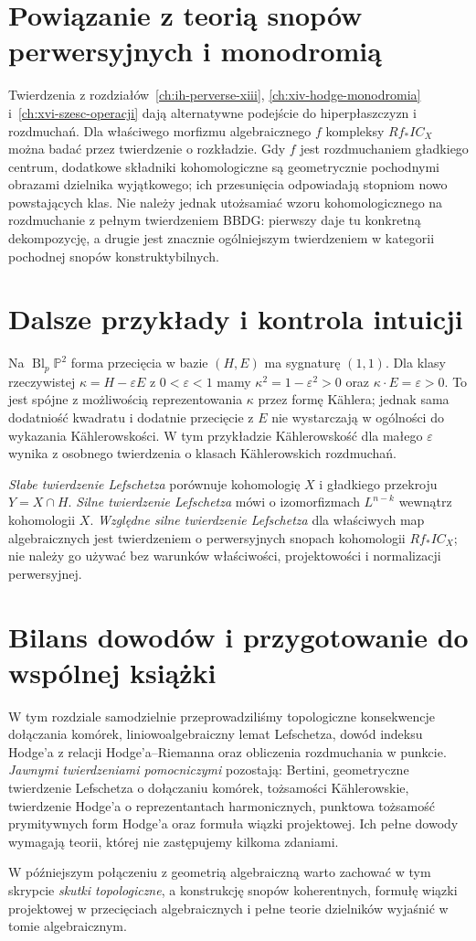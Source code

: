 \section{Powiązanie z teorią snopów perwersyjnych i monodromią}
Twierdzenia z rozdziałów~\ref{ch:ih-perverse-xiii},
\ref{ch:xiv-hodge-monodromia} i~\ref{ch:xvi-szesc-operacji}
dają alternatywne podejście do hiperpłaszczyzn i rozdmuchań.
Dla właściwego morfizmu algebraicznego $f$ kompleksy $Rf_*IC_X$
można badać przez twierdzenie o rozkładzie.
Gdy $f$ jest rozdmuchaniem gładkiego centrum,
dodatkowe składniki kohomologiczne są geometrycznie
pochodnymi obrazami dzielnika wyjątkowego; ich przesunięcia
odpowiadają stopniom nowo powstających klas.
Nie należy jednak utożsamiać wzoru kohomologicznego
na rozdmuchanie z pełnym twierdzeniem BBDG:
pierwszy daje tu konkretną dekompozycję,
a drugie jest znacznie ogólniejszym twierdzeniem
w kategorii pochodnej snopów konstruktybilnych.

\section{Dalsze przykłady i kontrola intuicji}
\begin{przyklad}
Na $\operatorname{Bl}_p\mathbb P^2$ forma przecięcia w bazie
$(H,E)$ ma sygnaturę $(1,1)$. Dla klasy rzeczywistej
$\kappa=H-\varepsilon E$ z $0<\varepsilon<1$ mamy
$\kappa^2=1-\varepsilon^2>0$ oraz
$\kappa\cdot E=\varepsilon>0$.
To jest spójne z możliwością reprezentowania $\kappa$
przez formę Kählera; jednak sama dodatniość kwadratu
i dodatnie przecięcie z $E$ nie wystarczają w ogólności
do wykazania Kählerowskości. W tym przykładzie
Kählerowskość dla małego $\varepsilon$ wynika z osobnego
twierdzenia o klasach Kählerowskich rozdmuchań.
\end{przyklad}
\begin{przyklad}
\emph{Słabe twierdzenie Lefschetza} porównuje kohomologię $X$ i gładkiego
przekroju $Y=X\cap H$. \emph{Silne twierdzenie Lefschetza} mówi o
izomorfizmach $L^{n-k}$ wewnątrz kohomologii $X$.
\emph{Względne silne twierdzenie Lefschetza} dla właściwych map algebraicznych
jest twierdzeniem o perwersyjnych snopach kohomologii
$Rf_*IC_X$; nie należy go używać bez warunków
właściwości, projektowości i normalizacji perwersyjnej.
\end{przyklad}

\section{Bilans dowodów i przygotowanie do wspólnej książki}
W tym rozdziale samodzielnie przeprowadziliśmy topologiczne
konsekwencje dołączania komórek, liniowoalgebraiczny lemat
Lefschetza, dowód indeksu Hodge'a z relacji
Hodge'a--Riemanna oraz obliczenia rozdmuchania w punkcie.
\emph{Jawnymi twierdzeniami pomocniczymi} pozostają:
Bertini, geometryczne twierdzenie Lefschetza o dołączaniu
komórek, tożsamości Kählerowskie, twierdzenie Hodge'a
o reprezentantach harmonicznych, punktowa tożsamość
prymitywnych form Hodge'a oraz formuła wiązki projektowej.
Ich pełne dowody wymagają teorii, której nie zastępujemy
kilkoma zdaniami.

W późniejszym połączeniu z geometrią algebraiczną
warto zachować w tym skrypcie \emph{skutki topologiczne},
a konstrukcję snopów koherentnych, formułę wiązki
projektowej w przecięciach algebraicznych i pełne
teorie dzielników wyjaśnić w tomie algebraicznym.

